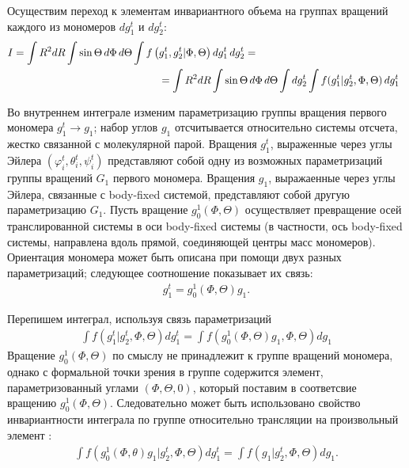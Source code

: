 \documentclass[14pt]{extarticle}
\newcommand{\lb}{\left(}
\newcommand{\rb}{\right)}
\begin{document}
Осуществим переход к элементам инвариантного объема на группах вращений каждого из мономеров $dg_1^t$ и $dg_2^t$:
\begin{gather}
	I = \int R^2 dR \int \sin \Theta \, d\Phi \, d \Theta \int f \lb g_1^t, g_2^t \rvert \Phi, \Theta \rb dg_1^t \, dg_2^t = \hspace{5cm} \notag \\
		\hspace{5cm} = \int R^2 dR \int \sin \Theta \, d\Phi \, d\Theta \int dg_2^t \int f( g_1^t \rvert g_2^t, \Phi, \Theta ) \, dg_1^t
\end{gather}

Во внутреннем интеграле изменим параметризацию группы вращения первого мономера $g_1^t \longrightarrow g_1$; набор углов $g_1$ отсчитывается относительно системы отсчета, жестко связанной с молекулярной парой. Вращения $g_1^t$, выраженные через углы Эйлера $(\varphi_i^t, \theta_i^t, \psi_i^t)$ представляют собой одну из возможных параметризаций группы вращений $G_1$ первого мономера. Вращения $g_1$, выражаенные через углы Эйлера, связанные с body-fixed системой, представляют собой другую параметризацию $G_1$. Пусть вращение $g_0^1( \Phi, \Theta )$ осуществляет превращение осей транслированной системы в оси body-fixed системы (в частности, ось body-fixed системы, направлена вдоль прямой, соединяющей центры масс мономеров). Ориентация мономера может быть описана при помощи двух разных параметризаций; следующее соотношение показывает их связь: 
\begin{gather}
	g_1^t = g_0^1(\Phi, \Theta) g_1.
\end{gather}

Перепишем интеграл, используя связь параметризаций
\begin{gather}
		\int f \lb g_1^t \rvert g_2^t, \Phi, \Theta \rb dg_1^t = \int f \lb g_0^1 \lb \Phi, \Theta \rb g_1, \Phi, \Theta \rb dg_1
\end{gather}
Вращение $g_0^1(\Phi, \Theta)$ по смыслу не принадлежит к группе вращений мономера, однако с формальной точки зрения в группе содержится элемент, параметризованный углами $(\Phi, \Theta, 0)$, который поставим в соответсвие вращению $g_0^1(\Phi, \Theta)$. Следовательно может быть использовано свойство инвариантности интеграла по группе относительно трансляции на произвольный элемент \cite{gelfand, naimark}:
\begin{gather}
		\int f(g_0^1 \lb \Phi, \theta \rb g_1 \rvert g_2^t, \Phi, \Theta) dg_1^t = \int f(g_1 \rvert g_2^t, \Phi, \Theta) dg_1.
\end{gather}
\end{document}
